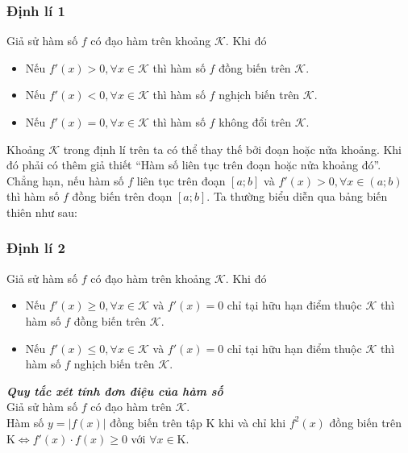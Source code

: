 \begin{khung}
	
	\subsubsection{Định lí 1}
	Giả sử hàm số $f$ có đạo hàm trên khoảng $\mathcal{K}$. Khi đó
	\begin{itemize}
		\item Nếu $f'(x)> 0, \forall x\in \mathcal{K}$ thì hàm số $f$ đồng biến trên $\mathcal{K}$.
		\item Nếu $f'(x)< 0, \forall x\in \mathcal{K}$ thì hàm số $f$ nghịch biến trên $\mathcal{K}$.
		\item Nếu $f'(x)= 0, \forall x\in \mathcal{K}$ thì hàm số $f$ không đổi trên $\mathcal{K}$.
	\end{itemize}
	\begin{note}
		Khoảng $\mathcal{K}$ trong định lí trên ta có thể thay thế bởi đoạn hoặc nửa khoảng. Khi đó phải có thêm giả thiết ``Hàm số liên tục trên đoạn hoặc nửa khoảng đó''. Chẳng hạn, nếu hàm số $f$ liên tục trên đoạn $[a;b]$ và $f'(x)>0, \forall x\in (a;b)$ thì hàm số $f$ đồng biến trên đoạn $[a;b]$. Ta thường biểu diễn qua bảng biến thiên như sau:
		\begin{center}
		\end{center}
	\end{note}
	
	\subsubsection{Định lí 2}
	Giả sử hàm số $f$ có đạo hàm trên khoảng $\mathcal{K}$. Khi đó
	\begin{itemize}
		\item Nếu $f'(x)\geq 0, \forall x\in \mathcal{K}$ và $f'(x)=0$ chỉ tại hữu hạn điểm thuộc $\mathcal{K}$ thì hàm số $f$ đồng biến trên $\mathcal{K}$.
		\item Nếu $f'(x)\leq 0, \forall x\in \mathcal{K}$ và $f'(x)=0$ chỉ tại hữu hạn điểm thuộc $\mathcal{K}$ thì hàm số $f$ nghịch biến trên $\mathcal{K}$.
	\end{itemize}
	\emph{\textbf{Quy tắc xét tính đơn điệu của hàm số}}\\
	Giả sử hàm số $f$ có đạo hàm trên $\mathcal{K}$.\\
	Hàm số $y=\left|f(x) \right|$ đồng biến trên tập $\mathrm{K}$ khi và chỉ khi $f^2(x)$ đồng biến trên $\mathrm{K} \Leftrightarrow f'(x) \cdot f(x) \geq 0$ với $\forall x \in \mathrm{K}.$
\end{khung}


